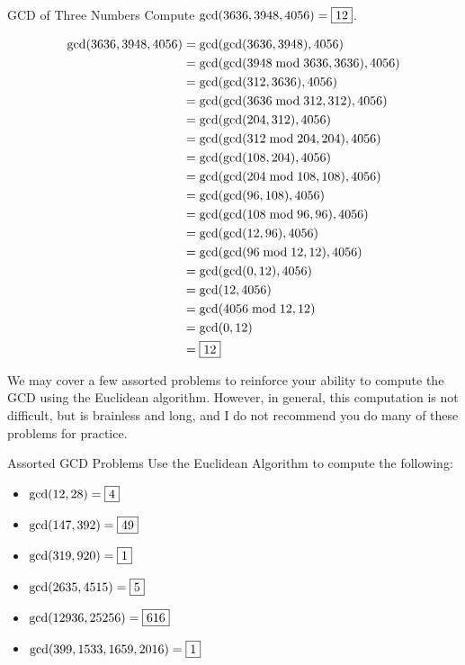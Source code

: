 \documentclass[a4paper,10pt]{report}
\begin{document}
\begin{problem}{GCD of Three Numbers}
 Compute \(\gcd(3636, 3948, 4056) = \Ans{12}\).

 \begin{solution}
  \begin{align*}
   \gcd(3636, 3948, 4056)
   &= \gcd(\gcd(3636, 3948), 4056) \\
   &= \gcd(\gcd(3948 \bmod 3636, 3636), 4056) \\
   &= \gcd(\gcd(312, 3636), 4056) \\
   &= \gcd(\gcd(3636 \bmod 312, 312), 4056) \\
   &= \gcd(\gcd(204, 312), 4056) \\
   &= \gcd(\gcd(312 \bmod 204, 204), 4056) \\
   &= \gcd(\gcd(108, 204), 4056) \\
   &= \gcd(\gcd(204 \bmod 108, 108), 4056) \\
   &= \gcd(\gcd(96, 108), 4056) \\
   &= \gcd(\gcd(108 \bmod 96, 96), 4056) \\
   &= \gcd(\gcd(12, 96), 4056) \\
   &= \gcd(\gcd(96 \bmod 12, 12), 4056) \\
   &= \gcd(\gcd(0, 12), 4056) \\
   &= \gcd(12, 4056) \\
   &= \gcd(4056 \bmod 12, 12) \\
   &= \gcd(0, 12) \\
   &= \Ans{12}
  \end{align*}
 \end{solution}
\end{problem}

We may cover a few assorted problems to reinforce your ability to compute the
GCD using the Euclidean algorithm. However, in general, this computation is not
difficult, but is brainless and long, and I do not recommend you do many of
these problems for practice.

\begin{problem}{Assorted GCD Problems}
 Use the Euclidean Algorithm to compute the following:

 \begin{itemize}
  \item \(\gcd(12, 28) = \Ans{4}\)
  \item \(\gcd(147, 392) = \Ans{49}\)
  \item \(\gcd(319, 920) = \Ans{1}\)
  \item \(\gcd(2635, 4515) = \Ans{5}\)
  \item \(\gcd(12936, 25256) = \Ans{616}\)
  \item \(\gcd(399, 1533, 1659, 2016) = \Ans{1}\)
 \end{itemize}
\end{problem}
\end{document}
